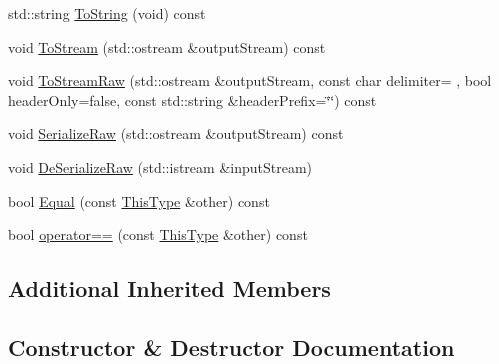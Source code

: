 \begin{DoxyCompactItemize}
\item 
std\+::string \hyperlink{classvct_euler_rotation3_a349acb59de9a6771be003c3a41ee0751}{To\+String} (void) const 
\item 
void \hyperlink{classvct_euler_rotation3_a782fdd1eeb4b28f6d8b95231ea81701e}{To\+Stream} (std\+::ostream \&output\+Stream) const 
\item 
void \hyperlink{classvct_euler_rotation3_ae5f2837e74309b0c5219faa4b8fc53cd}{To\+Stream\+Raw} (std\+::ostream \&output\+Stream, const char delimiter= \textquotesingle{} \textquotesingle{}, bool header\+Only=false, const std\+::string \&header\+Prefix=\char`\"{}\char`\"{}) const 
\item 
void \hyperlink{classvct_euler_rotation3_a109633a8db4df0f0b748c524d5efcf42}{Serialize\+Raw} (std\+::ostream \&output\+Stream) const 
\item 
void \hyperlink{classvct_euler_rotation3_ab1221bb31534a965012934d39762415d}{De\+Serialize\+Raw} (std\+::istream \&input\+Stream)
\end{DoxyCompactItemize}
{\bf }\par
\begin{DoxyCompactItemize}
\item 
bool \hyperlink{classvct_euler_rotation3_abc2bfe6784cac5084eda39665f673e70}{Equal} (const \hyperlink{classvct_euler_rotation3}{This\+Type} \&other) const 
\item 
bool \hyperlink{classvct_euler_rotation3_a1d8bf83313f6909ae9144d50c50a79e7}{operator==} (const \hyperlink{classvct_euler_rotation3}{This\+Type} \&other) const 
\end{DoxyCompactItemize}

\subsection*{Additional Inherited Members}


\subsection{Constructor \& Destructor Documentation}
\hypertarget{classvct_euler_rotation3_ab3529b2681173b63a24cc13ae21b90cc}{}
